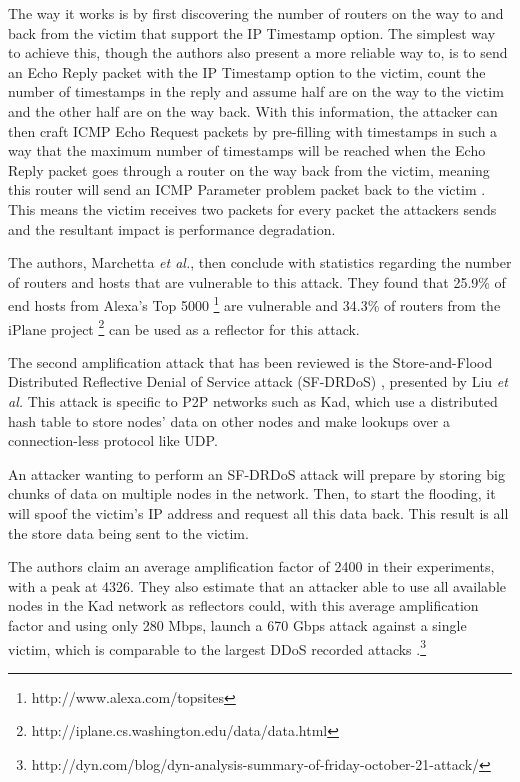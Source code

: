 \documentclass[conference]{IEEEtran}
\begin{document}
The way it works is by first discovering the number of routers on the way to and back from the victim that support the IP Timestamp option. The simplest way to achieve this, though the authors also present a more reliable way to, is to send an Echo Reply packet with the IP Timestamp option to the victim, count the number of timestamps in the reply and assume half are on the way to the victim and the other half are on the way back. With this information, the attacker can then craft ICMP Echo Request packets by pre-filling with timestamps in such a way that the maximum number of timestamps will be reached when the Echo Reply packet goes through a router on the way back from the victim, meaning this router will send an ICMP Parameter problem packet back to the victim \cite{GreenhouseEffect:Marchetta}. This means the victim receives two packets for every packet the attackers sends and the resultant impact is performance degradation.

The authors, Marchetta \textit{et al.}, then conclude with statistics regarding the number of routers and hosts that are vulnerable to this attack. They found that 25.9\% of end hosts from Alexa's Top 5000 \footnote{http://www.alexa.com/topsites} are vulnerable and 34.3\% of routers from the iPlane project \footnote{http://iplane.cs.washington.edu/data/data.html} can be used as a reflector for this attack.

The second amplification attack that has been reviewed is the Store-and-Flood Distributed Reflective Denial of Service attack (SF-DRDoS) \cite{Liu:SFDRDoS}, presented by Liu \textit{et al.} This attack is specific to P2P networks such as Kad, which use a distributed hash table to store nodes' data on other nodes and make lookups over a connection-less protocol like UDP.

An attacker wanting to perform an SF-DRDoS attack will prepare by storing big chunks of data on multiple nodes in the network. Then, to start the flooding, it will spoof the victim's IP address and request all this data back. This result is all the store data being sent to the victim.

The authors claim an average amplification factor of 2400 in their experiments, with a peak at 4326. They also estimate that an attacker able to use all available nodes in the Kad network as reflectors could, with this average amplification factor and using only 280 Mbps, launch a 670 Gbps attack against a single victim, which is comparable to the largest DDoS recorded attacks \cite{Arbor:WISR}.\footnote{http://dyn.com/blog/dyn-analysis-summary-of-friday-october-21-attack/}
\end{document}
